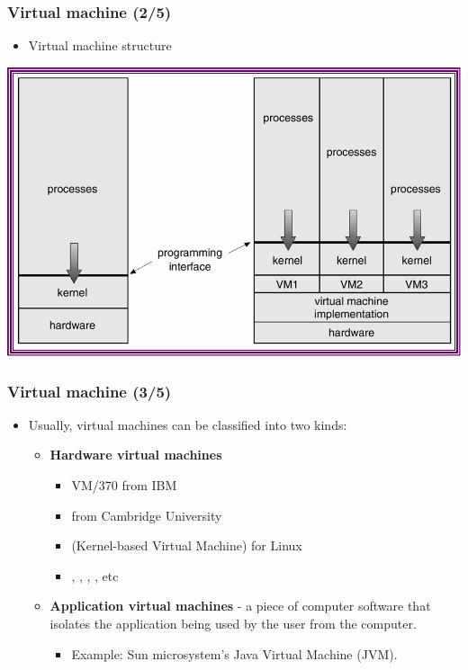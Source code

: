 \documentclass[CJKutf8,xcolor=pdftex,dvipsnames,table]{beamer}
\begin{document}
\begin{CJK*}{UTF8}{song}
  \begin{frame}
    \frametitle{Virtual machine (2/5)} \pause
    \begin{itemize}
    \item{Virtual machine structure} \pause
    \end{itemize}
    \begin{center}
      \includegraphics[scale=0.6]{v6f3-11} \pause
    \end{center}
  \end{frame}

  \begin{frame}
    \frametitle{Virtual machine (3/5)} \pause
    \begin{itemize}
    \item{Usually, virtual machines can be classified into two kinds:} \pause
      \begin{itemize}
      \item{\textbf{Hardware virtual machines}} \pause
        \begin{itemize}
		\item{VM/370 from IBM} \pause
		\item{ from Cambridge University} \pause
		\item{ (Kernel-based Virtual Machine) for Linux} \pause
		\item{, , , , etc} \pause
		\end{itemize}
      \item{\textbf{Application virtual machines} \pause - a piece of computer software that isolates the application being used by the user from the computer. } \pause
        \begin{itemize}
        \item{Example: Sun microsystem's Java Virtual Machine (JVM).}
        \end{itemize}
      \end{itemize}
    \end{itemize}
  \end{frame}
  

\end{CJK*}
\end{document}
